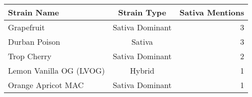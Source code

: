 \begin{tabular}{lcr}
\toprule
Strain Name & Strain Type & Sativa Mentions \\
\midrule
Grapefruit & Sativa Dominant & 3 \\
Durban Poison & Sativa & 3 \\
Trop Cherry & Sativa Dominant & 2 \\
Lemon Vanilla OG (LVOG) & Hybrid & 1 \\
Orange Apricot MAC & Sativa Dominant & 1 \\
\bottomrule
\end{tabular}
